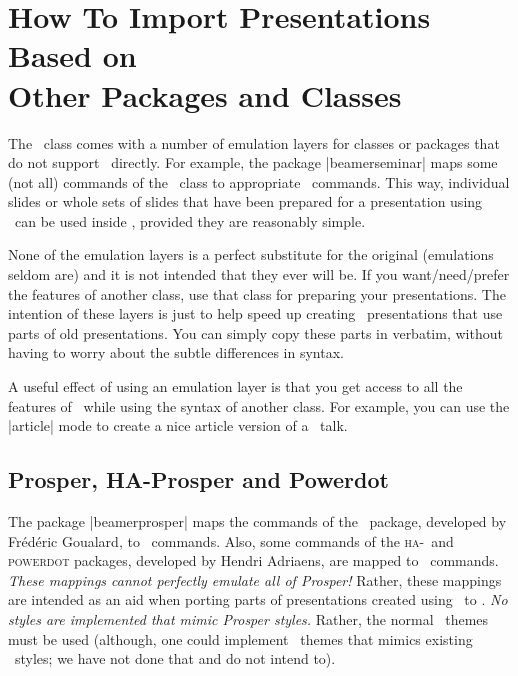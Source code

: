 %
%
%

\section[How To Import Presentations Based on Other Packages and Classes]{How To Import Presentations Based on\\ Other Packages and Classes}

The \beamer\ class comes with a number of emulation layers for classes or packages that do not support \beamer\ directly. For example, the package |beamerseminar| maps some (not all) commands of the \seminar\ class to appropriate \beamer\ commands. This way, individual slides or whole sets of slides that have been prepared for a presentation using \seminar\ can be used inside \beamer, provided they are reasonably simple.

None of the emulation layers is a perfect substitute for the original (emulations seldom are) and it is not intended that they ever will be. If you want/need/prefer the features of another class, use that class for preparing your presentations. The intention of these layers is just to help speed up creating \beamer\ presentations that use parts of old presentations. You can simply copy these parts in verbatim, without having to worry about the subtle differences in syntax.

A useful effect of using an emulation layer is that you get access to all the features of \beamer\ while using the syntax of another class. For example, you can use the |article| mode to create a nice article version of a \prosper\ talk.


\subsection{Prosper, HA-Prosper and Powerdot}
\label{section-prosper}

The package |beamerprosper| maps the commands of the \prosper\ package, developed by Fr\'ed\'eric Goualard, to \beamer\ commands. Also, some commands of the \textsc{ha}-\prosper\ and \textsc{powerdot} packages, developed by Hendri Adriaens, are mapped to \beamer\ commands. \emph{These mappings cannot perfectly emulate all of Prosper!} Rather, these mappings are intended as an aid when porting parts of presentations created using \prosper\ to \beamer. \emph{No styles are implemented that mimic Prosper styles.} Rather, the normal \beamer\ themes must be used (although, one could implement \beamer\ themes that mimics existing \prosper\ styles; we have not done that and do not intend to).

